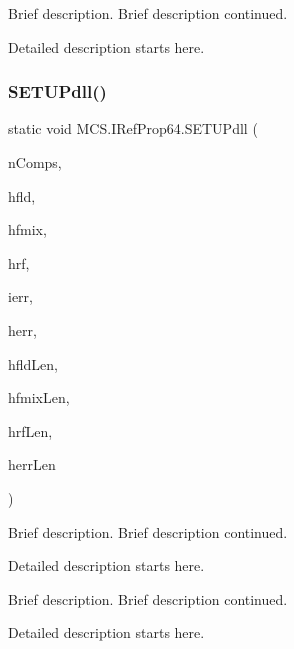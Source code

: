 Brief description. Brief description continued. 

Detailed description starts here. \hypertarget{class_m_c_s_1_1_i_ref_prop64_ad607be1bfa7cffbcfd5a8b7856965cc6}{}\label{class_m_c_s_1_1_i_ref_prop64_ad607be1bfa7cffbcfd5a8b7856965cc6} 
\subsubsection{\texorpdfstring{S\+E\+T\+U\+Pdll()}{SETUPdll()}}
{\footnotesize\ttfamily static void M\+C\+S.\+I\+Ref\+Prop64.\+S\+E\+T\+U\+Pdll (\begin{DoxyParamCaption}\item[{ref long}]{n\+Comps,  }\item[{\mbox{[}\+Marshal\+As(\+Unmanaged\+Type.\+V\+B\+By\+Ref\+Str)\mbox{]} ref string}]{hfld,  }\item[{\mbox{[}\+Marshal\+As(\+Unmanaged\+Type.\+V\+B\+By\+Ref\+Str)\mbox{]} ref string}]{hfmix,  }\item[{\mbox{[}\+Marshal\+As(\+Unmanaged\+Type.\+V\+B\+By\+Ref\+Str)\mbox{]} ref string}]{hrf,  }\item[{ref long}]{ierr,  }\item[{\mbox{[}\+Marshal\+As(\+Unmanaged\+Type.\+V\+B\+By\+Ref\+Str)\mbox{]} ref string}]{herr,  }\item[{ref long}]{hfld\+Len,  }\item[{ref long}]{hfmix\+Len,  }\item[{ref long}]{hrf\+Len,  }\item[{ref long}]{herr\+Len }\end{DoxyParamCaption})}



Brief description. Brief description continued. 

Detailed description starts here.

Brief description. Brief description continued.

Detailed description starts here. \hypertarget{class_m_c_s_1_1_i_ref_prop64_ad29871572cfade99eb9e9ee443740b17}{}\label{class_m_c_s_1_1_i_ref_prop64_ad29871572cfade99eb9e9ee443740b17} 
